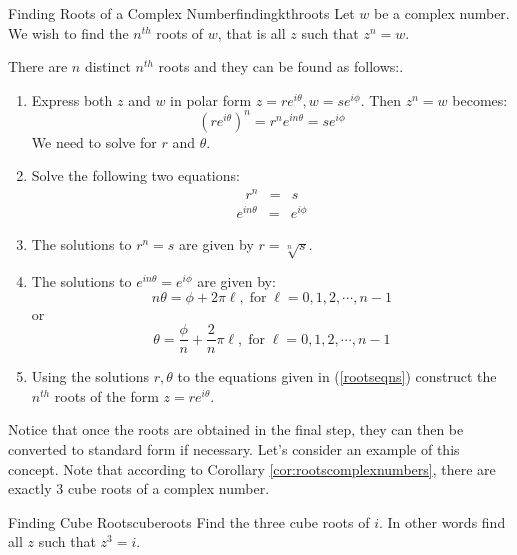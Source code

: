 \begin{procedure}{Finding Roots of a Complex Number}{findingkthroots}
Let $w$ be a complex number. We wish to find the $n^{th}$ roots of $w$, that is all $z$ such that $z^n = w$. 

There are $n$ distinct $n^{th}$ roots and they can be found as follows:. 
 
\begin{enumerate}
\item Express both $z$ and $w$ in polar form $z=re^{i\theta}, w=se^{i\phi}$. Then $z^n = w$ becomes:
\[
(re^{i\theta})^n = r^n e^{i n \theta} = se^{i\phi}
\]
We need to solve for $r$ and $\theta$. 
\item Solve the following two equations:
\begin{eqnarray*}
r^n &=& s 
\end{eqnarray*}
\begin{eqnarray}
e^{i n \theta} &=& e^{i \phi}
\label{rootseqns}
\end{eqnarray}
\item The solutions to $r^n = s$ are given by $r = \sqrt[n]{s}$. 

\item The solutions to $e^{i n \theta} = e^{i \phi}$ are given by:
\[
n\theta = \phi + 2\pi \ell,  \; \mbox{for} \; \ell = 0,1,2, \cdots, n-1
\]
or
\[
\theta = \frac{\phi}{n} + \frac{2}{n} \pi \ell, \; \mbox{for} \; \ell = 0,1,2, \cdots, n-1 
\]
\item
Using the solutions $r, \theta$ to the equations given in (\ref{rootseqns})
construct the $n^{th}$ roots of the form $z = re^{i\theta}$.  
\end{enumerate}
\end{procedure}

Notice that once the roots are obtained in the final step, they can then be converted to standard form if necessary. Let's consider an example of this concept. Note that according to Corollary \ref{cor:rootscomplexnumbers}, 
there are exactly $3$ cube roots of a complex number.

\begin{example}{Finding Cube Roots}{cuberoots}
Find the three cube roots of $i.$ In other words find all $z$ such that $z^3 = i$. 
\end{example}

